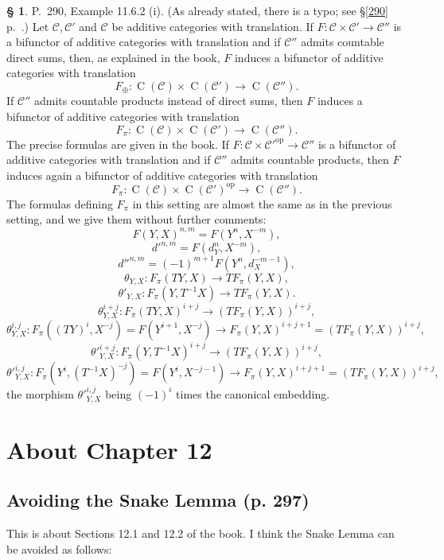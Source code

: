 \documentclass[12pt]{article}%
\theoremstyle{remark}
\theoremstyle{definition}
\newtheorem{s}[thm]{\S}%
\newcommand{\C}{\mathcal C}
\DeclareMathOperator{\op}{op}
\begin{document}
\begin{s}
P.~290, Example 11.6.2 (i). (As already stated, there is a typo; see \S\ref{290} p.~\pageref{290}.) Let $\C,\C'$ and $\C$ be additive categories with translation. If $F:\C\times\C'\to\C''$ is a bifunctor of additive categories with translation and if $\C''$ admits countable direct sums, then, as explained in the book, $F$ induces a bifunctor of additive categories with translation 
$$
F_\oplus:\operatorname{C}(\C)\times\operatorname{C}(\C')\to\operatorname{C}(\C'').
$$ 
If $\C''$ admits countable products instead of direct sums, then $F$ induces a bifunctor of additive categories with translation 
$$
F_\pi:\operatorname{C}(\C)\times\operatorname{C}(\C')\to\operatorname{C}(\C'').
$$ 
The precise formulas are given in the book. If $F:\C\times\C'^\op\to\C''$ is a bifunctor of additive categories with translation and if $\C''$ admits countable products, then $F$ induces again a bifunctor of additive categories with translation 
$$
F_\pi:\operatorname{C}(\C)\times\operatorname{C}(\C')^{\op}\to\operatorname{C}(\C'').
$$ 
The formulas defining $F_\pi$ in this setting are almost the same as in the previous setting, and we give them without further comments:
$$
F(Y,X)^{n,m}=F(Y^n,X^{-m}),
$$
$$
d'^{n,m}=F(d_Y^n,X^{-m}),
$$
$$
d''^{n,m}=(-1)^{m+1}F(Y^n,d_X^{-m-1}),
$$
$$
\theta_{Y,X}:F_\pi(TY,X)\to TF_\pi(Y,X),
$$
$$
\theta'_{Y,X}:F_\pi(Y,T^{-1}X)\to TF_\pi(Y,X).
$$
$$
\theta_{Y,X}^{i+j}:F_\pi(TY,X)^{i+j}\to(TF_\pi(Y,X))^{i+j},
$$
$$
\theta_{Y,X}^{i,j}:F_\pi((TY)^i,X^{-j})=F(Y^{i+1},X^{-j})\to F_\pi(Y,X)^{i+j+1}=(TF_\pi(Y,X))^{i+j},
$$
$$
{\theta'}_{Y,X}^{i+j}:F_\pi(Y,T^{-1}X)^{i+j}\to(TF_\pi(Y,X))^{i+j},
$$
$$
{\theta'}_{Y,X}^{i,j}:F_\pi(Y^i,(T^{-1}X)^{-j})=F(Y^i,X^{-j-1})\to F_\pi(Y,X)^{i+j+1}=(TF_\pi(Y,X))^{i+j},
$$
the morphism ${\theta'}_{Y,X}^{i,j}$ being $(-1)^i$ times the canonical embedding.
\end{s}


\section{About Chapter 12}

\subsection{Avoiding the Snake Lemma (p. 297)}  

This is about Sections 12.1 and 12.2 of the book. I think the Snake Lemma can be avoided as follows: 
\end{document}
